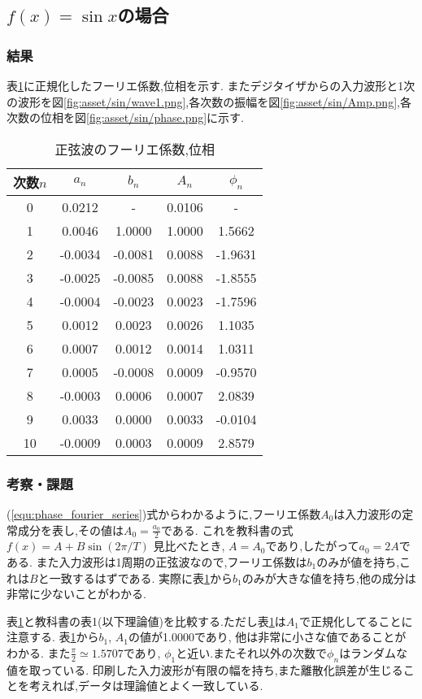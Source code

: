\subsection{$f(x)=\sin x$の場合}
\subsubsection{結果}
表\ref{tab:sin_res}に正規化したフーリエ係数,位相を示す.
またデジタイザからの入力波形と1次の波形を図\ref{fig:asset/sin/wave1.png},各次数の振幅を図\ref{fig:asset/sin/Amp.png},各次数の位相を図\ref{fig:asset/sin/phase.png}に示す.
\begin{table}[h]
   \caption{正弦波のフーリエ係数,位相}
   \label{tab:sin_res}
   \centering
   \begin{tabular}{ccccc}
     \hline
     次数$n$&$a_n$&$b_n$&$A_n$&$\phi_n$\\
     \hline \hline
     0 & 0.0212 & - & 0.0106 & - \\
1 & 0.0046 & 1.0000 & 1.0000 & 1.5662 \\
2 & -0.0034 & -0.0081 & 0.0088 & -1.9631 \\
3 & -0.0025 & -0.0085 & 0.0088 & -1.8555 \\
4 & -0.0004 & -0.0023 & 0.0023 & -1.7596 \\
5 & 0.0012 & 0.0023 & 0.0026 & 1.1035 \\
6 & 0.0007 & 0.0012 & 0.0014 & 1.0311 \\
7 & 0.0005 & -0.0008 & 0.0009 & -0.9570 \\
8 & -0.0003 & 0.0006 & 0.0007 & 2.0839 \\
9 & 0.0033 & 0.0000 & 0.0033 & -0.0104 \\
10 & -0.0009 & 0.0003 & 0.0009 & 2.8579 \\
     \hline
   \end{tabular}
\end{table}
\begin{figure}[htbp]
  \begin{minipage}{0.5\hsize}
  \end{minipage}
  \begin{minipage}{0.5\hsize}
  \end{minipage} 
\end{figure}
\subsubsection{考察・課題}
(\ref{equ:phase_fourier_series})式からわかるように,フーリエ係数$A_0$は入力波形の定常成分を表し,その値は$A_0=\frac{a_0}{2}$である.
これを教科書の式$f(x)=A+B\sin(2\pi/T)$ \cite{rikougaku}見比べたとき, $A=A_0$であり,したがって$a_0=2A$である.
また入力波形は1周期の正弦波なので,フーリエ係数は$b_1$のみが値を持ち,これは$B$と一致するはずである.
実際に表\ref{tab:sin_res}から$b_1$のみが大きな値を持ち,他の成分は非常に少ないことがわかる.

表\ref{tab:sin_res}と教科書の表1(以下理論値)を比較する.ただし表\ref{tab:sin_res}は$A_1$で正規化してることに注意する.
表\ref{tab:sin_res}から$b_1$, $A_1$の値が1.0000であり, 他は非常に小さな値であることがわかる.
また$\tfrac{\pi}{2}\simeq1.5707$であり, $\phi_1$と近い.またそれ以外の次数で$\phi_n$はランダムな値を取っている.
印刷した入力波形が有限の幅を持ち,また離散化誤差が生じることを考えれば,データは理論値とよく一致している.